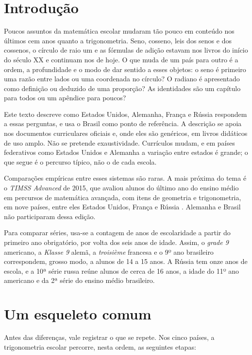 \documentclass[
    article,
    12pt,
    a4paper,
    sumario=tradicional
]{abntex2}
\begin{document}
\textual

\section{Introdução}

Poucos assuntos da matemática escolar mudaram tão pouco em conteúdo nos
últimos cem anos quanto a trigonometria. Seno, cosseno, leis dos senos e dos
cossenos, o círculo de raio um e as fórmulas de adição estavam nos livros do
início do século XX e continuam nos de hoje. O que muda de um país para outro
é a ordem, a profundidade e o modo de dar sentido a esses objetos: o seno é
primeiro uma razão entre lados ou uma coordenada no círculo? O radiano é
apresentado como definição ou deduzido de uma proporção? As identidades são
um capítulo para todos ou um apêndice para poucos?

Este texto descreve como Estados Unidos, Alemanha, França e Rússia respondem a
essas perguntas, e usa o Brasil como ponto de referência. A descrição se apoia
nos documentos curriculares oficiais e, onde eles são genéricos, em livros
didáticos de uso amplo. Não se pretende exaustividade. Currículos mudam, e em
países federativos como Estados Unidos e Alemanha a variação entre estados é
grande; o que segue é o percurso típico, não o de cada escola.

Comparações empíricas entre esses sistemas são raras. A mais próxima do tema é
o \textit{TIMSS Advanced} de 2015, que avaliou alunos do último ano do ensino
médio em percursos de matemática avançada, com itens de geometria e
trigonometria, em nove países, entre eles Estados Unidos, França e Rússia
\cite{mullis2016}. Alemanha e Brasil não participaram dessa edição.

Para comparar séries, usa-se a contagem de anos de escolaridade a partir do
primeiro ano obrigatório, por volta dos seis anos de idade. Assim, o \textit{grade
9} americano, a \textit{Klasse 9} alemã, a \textit{troisième} francesa e o 9º ano
brasileiro correspondem, grosso modo, a alunos de 14 a 15 anos. A Rússia tem
onze anos de escola, e a 10ª série russa reúne alunos de cerca de 16 anos, a
idade do 11º ano americano e da 2ª série do ensino médio brasileiro.

\section{Um esqueleto comum}

Antes das diferenças, vale registrar o que se repete. Nos cinco países, a
trigonometria escolar percorre, nesta ordem, as seguintes etapas:
\end{document}
